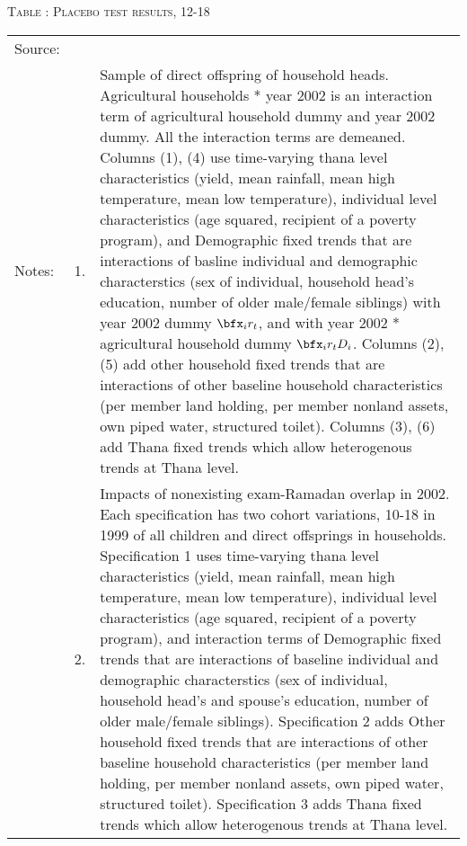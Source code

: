 \begin{table}
\hfil\textsc{\footnotesize Table \thetable: Placebo test results, 12-18\label{PlaceboResults12Table}}\\
\setlength{\tabcolsep}{1pt}
\renewcommand{\arraystretch}{.55}
\hfil

\renewcommand{\arraystretch}{1}
\hfil\begin{tabular}{>{\hfill\scriptsize}p{1cm}<{}>{\hfill\scriptsize}p{.5cm}<{}>{\scriptsize}p{12cm}<{\hfill}}
Source:& \multicolumn{2}{l}{\scriptsize Compiled from IFPRI data. }\\[-1ex]
Notes:& 1. & Sample of direct offspring of household heads. \textsf{Agricultural households * year 2002} is an interaction term of agricultural household dummy and year 2002 dummy. All the interaction terms are demeaned. Columns \textsf{(1), (4)} use time-varying thana level characteristics (yield, mean rainfall, mean high temperature, mean low temperature), individual level characteristics (age squared, recipient of a poverty program), and \textsf{Demographic fixed trends} that are interactions of basline individual and demographic characterstics (sex of individual, household head's education, number of older male/female siblings) with year 2002 dummy $\bfx_{i}r_{t}$, and with year 2002 * agricultural household dummy $\bfx_{i}r_{t}D_{i}$. Columns \textsf{(2), (5)} add \textsf{other household fixed trends} that are interactions of other baseline household characteristics (per member land holding, per member nonland assets, own piped water, structured toilet). Columns \textsf{(3), (6)} add \textsf{Thana fixed trends} which allow heterogenous trends at Thana level. \\[-1ex]
& 2. & Impacts of nonexisting exam-Ramadan overlap in 2002. Each specification has two cohort variations, \textsf{10-18 in 1999} of all children and direct offsprings in households. \textsf{Specification 1} uses time-varying thana level characteristics (yield, mean rainfall, mean high temperature, mean low temperature), individual level characteristics (age squared, recipient of a poverty program), and interaction terms of \textsf{Demographic fixed trends} that are interactions of baseline individual and demographic characterstics (sex of individual, household head's and spouse's education, number of older male/female siblings). \textsf{Specification 2} adds \textsf{Other household fixed trends} that are interactions of other baseline household characteristics (per member land holding, per member nonland assets, own piped water, structured toilet). \textsf{Specification 3} adds \textsf{Thana fixed trends} which allow heterogenous trends at Thana level. \\[-1ex]

\end{tabular}
\end{table}
